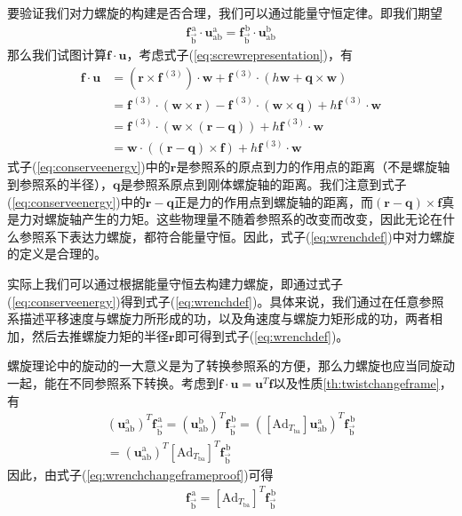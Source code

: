 \documentclass[12pt, a4paper, article, UTF8]{ctexart}
\begin{document}
要验证我们对力螺旋的构建是否合理，我们可以通过能量守恒定律。即我们期望
\begin{align}
\mathbf{f}^{\,\text{a}}_{\vec{\text{b}}} \cdot \mathbf{u}_\text{ab}^{\text{a}} = \mathbf{f}^{\,\text{b}}_{\vec{\text{b}}} \cdot\mathbf{u}_\text{ab}^\text{b}
\end{align}
那么我们试图计算$\mathbf{f} \cdot\mathbf{u}$，考虑式子(\ref{eq:screwrepresentation})，有
\begin{align}
\mathbf{f}\cdot\mathbf{u} &= (\mathbf{r} \times \mathbf{f}^{\,{(3)}}) \cdot \mathbf{w}+ \mathbf{f}^{\,{(3)}} \cdot (h\mathbf{w}+\mathbf{q} \times \mathbf{w}) \nonumber \\
&= \mathbf{f}^{\,{(3)}}\cdot (\mathbf{w} \times \mathbf{r}) - \mathbf{f}^{\,{(3)}} \cdot (\mathbf{w} \times \mathbf{q}) + h\mathbf{f}^{\,{(3)}} \cdot \mathbf{w} \nonumber \\
&= \mathbf{f}^{\,{(3)}} \cdot (\mathbf{w} \times (\mathbf{r}-\mathbf{q})) + h\mathbf{f}^{\,{(3)}} \cdot \mathbf{w} \nonumber \\
&= \mathbf{w} \cdot ((\mathbf{r}-\mathbf{q}) \times \mathbf{f}) + h\mathbf{f}^{\,{(3)}} \cdot 
\mathbf{w} \label{eq:conserveenergy}
\end{align}
式子(\ref{eq:conserveenergy})中的$\mathbf{r}$是参照系的原点到力的作用点的距离（不是螺旋轴到参照系的半径），$\mathbf{q}$是参照系原点到刚体螺旋轴的距离。我们注意到式子(\ref{eq:conserveenergy})中的$\mathbf{r}-\mathbf{q}$正是力的作用点到螺旋轴的距离，而$(\mathbf{r}-\mathbf{q}) \times \mathbf{f}$真是力对螺旋轴产生的力矩。这些物理量不随着参照系的改变而改变，因此无论在什么参照系下表达力螺旋，都符合能量守恒。因此，式子(\ref{eq:wrenchdef})中对力螺旋的定义是合理的。

实际上我们可以通过根据能量守恒去构建力螺旋，即通过式子(\ref{eq:conserveenergy})得到式子(\ref{eq:wrenchdef})。具体来说，我们通过在任意参照系描述平移速度与螺旋力所形成的功，以及角速度与螺旋力矩形成的功，两者相加，然后去推螺旋力矩的半径$\mathbf{r}$即可得到式子(\ref{eq:wrenchdef})。

螺旋理论中的旋动的一大意义是为了转换参照系的方便，那么力螺旋也应当同旋动一起，能在不同参照系下转换。考虑到$\mathbf{f}\cdot \mathbf{u} = \mathbf{u}^T \mathbf{f}$以及性质\ref{th:twistchangeframe}，有
\begin{align}
(\mathbf{u}_\text{ab}^\text{a})^T \mathbf{f}_{\vec{\text{b}}}^{\,\text{a}} = (\mathbf{u}_\text{ab}^\text{b})^T \mathbf{f}_{\vec{\text{b}}}^{\,\text{b}} =
([\text{Ad}_{T_\text{ba}}]\mathbf{u}_\text{ab}^\text{a})^T \mathbf{f}_{\vec{\text{b}}}^{\,\text{b}} \label{eq:conservationofenergywrench}  \\
 =(\mathbf{u}_{\text{ab}}^\text{a})^T  [\text{Ad}_{T_\text{ba}}]^T\mathbf{f}_{\vec{\text{b}}}^{\,\text{b}}
 \label{eq:wrenchchangeframeproof}
\end{align}
因此，由式子(\ref{eq:wrenchchangeframeproof})可得
\begin{align}
\mathbf{f}_{\vec{\text{b}}}^{\,\text{a}} =  [\text{Ad}_{T_\text{ba}}]^T\mathbf{f}_{\vec{\text{b}}}^{\,\text{b}} \label{eq:wrenchchangeframeresult}
\end{align}
\end{document}
